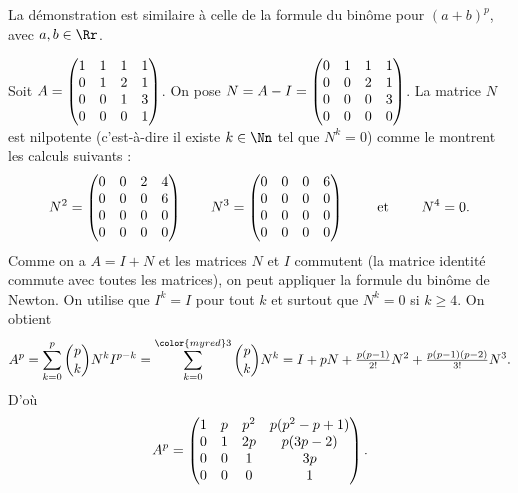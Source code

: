 \documentclass[class=report,crop=false]{standalone}
\begin{document}
La démonstration est similaire à celle de la formule du binôme pour $(a+b)^p$, avec $a,b \in \Rr$.


\begin{exemple}
Soit $A=\begin{pmatrix}
1&1&1&1\cr
0 & 1&2&1 \cr
0&0&1&3 \cr
0&0&0&1
\end{pmatrix}$.
On pose
$N=A-I= \begin{pmatrix}
0&1&1&1\cr
0 &0&2&1 \cr
0&0&0&3 \cr
0&0&0&0
\end{pmatrix}$.
La matrice $N$ est nilpotente
(c'est-à-dire il existe $k \in \Nn$ tel que $N^{k}=0$) comme le montrent les
calculs suivants :
$$N^{2}= \begin{pmatrix}
0&0&2&4\cr
0 &0&0&6 \cr
0&0&0&0 \cr
0&0&0&0
\end{pmatrix} \qquad
N^{3}= \begin{pmatrix}
0&0&0&6\cr
0 &0&0&0 \cr
0&0&0&0 \cr
0&0&0&0
\end{pmatrix}\qquad \text{ et } \qquad N^{4}=0.$$
Comme on a $A=I+N$ et les matrices $N$ et $I$ commutent (la matrice identité
commute avec toutes les matrices), on peut
appliquer la formule du binôme de Newton.
On utilise que $I^k=I$ pour tout $k$ et surtout que
$N^{k}=0$ si $k \geq 4$.
On obtient
$$
A^{p} = \sum_{k=0}^{p} \binom{p}{k} N^{k} I^{p-k}
= \displaystyle \sum_{k=0}^{{\color{myred}3}} \binom{p}{k} N^{k}
 = I+pN+\tfrac{p(p-1)}{2!}N^{2}+ \tfrac{p(p-1)(p-2)}{3!}N^{3}.$$
D'où
$$A^{p}= \begin{pmatrix}
1&p&p^{2}&p(p^{2}-p+1)\cr
0 & 1&2p&p(3p-2) \cr
0&0&1&3p \cr
0&0&0&1
\end{pmatrix}.$$
\end{exemple}



\end{document}
